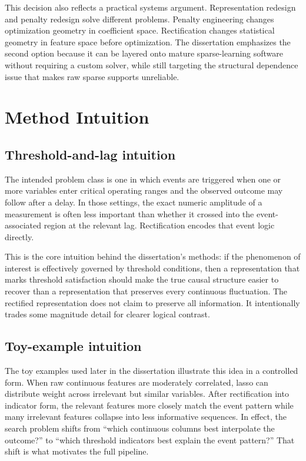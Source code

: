 This decision also reflects a practical systems argument. Representation redesign and penalty redesign solve different problems. Penalty engineering changes optimization geometry in coefficient space. Rectification changes statistical geometry in feature space before optimization. The dissertation emphasizes the second option because it can be layered onto mature sparse-learning software without requiring a custom solver, while still targeting the structural dependence issue that makes raw sparse supports unreliable.

\section{Method Intuition}

\subsection{Threshold-and-lag intuition}

The intended problem class is one in which events are triggered when one or more variables enter critical operating ranges and the observed outcome may follow after a delay. In those settings, the exact numeric amplitude of a measurement is often less important than whether it crossed into the event-associated region at the relevant lag. Rectification encodes that event logic directly.

This is the core intuition behind the dissertation's methods: if the phenomenon of interest is effectively governed by threshold conditions, then a representation that marks threshold satisfaction should make the true causal structure easier to recover than a representation that preserves every continuous fluctuation. The rectified representation does not claim to preserve all information. It intentionally trades some magnitude detail for clearer logical contrast.

\subsection{Toy-example intuition}

The toy examples used later in the dissertation illustrate this idea in a controlled form. When raw continuous features are moderately correlated, lasso can distribute weight across irrelevant but similar variables. After rectification into indicator form, the relevant features more closely match the event pattern while many irrelevant features collapse into less informative sequences. In effect, the search problem shifts from ``which continuous columns best interpolate the outcome?'' to ``which threshold indicators best explain the event pattern?'' That shift is what motivates the full pipeline.

